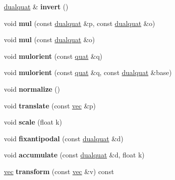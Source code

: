 \begin{DoxyCompactItemize}
\hyperlink{structdualquat}{dualquat} \& {\bfseries invert} ()
\item 
\mbox{\label{structdualquat_ac0b8fdb6d9e67813373c9957ac4b8aca}} 
void {\bfseries mul} (const \hyperlink{structdualquat}{dualquat} \&p, const \hyperlink{structdualquat}{dualquat} \&o)
\item 
\mbox{\label{structdualquat_af9940944e4a530e7f82e4f0eb5a70c74}} 
void {\bfseries mul} (const \hyperlink{structdualquat}{dualquat} \&o)
\item 
\mbox{\label{structdualquat_a39d015b5df10c297e1b56d2d966c2efe}} 
void {\bfseries mulorient} (const \hyperlink{structquat}{quat} \&q)
\item 
\mbox{\label{structdualquat_a765e740cb7fc2dfec283613cfa430413}} 
void {\bfseries mulorient} (const \hyperlink{structquat}{quat} \&q, const \hyperlink{structdualquat}{dualquat} \&base)
\item 
\mbox{\label{structdualquat_a93c67d4d04bdd2652e5c72f2d4bd3572}} 
void {\bfseries normalize} ()
\item 
\mbox{\label{structdualquat_a96d2ab7c1b91512bb3b514579497f297}} 
void {\bfseries translate} (const \hyperlink{structvec}{vec} \&p)
\item 
\mbox{\label{structdualquat_aedd716e397ffb0174e71ff7bba510c6b}} 
void {\bfseries scale} (float k)
\item 
\mbox{\label{structdualquat_a25fe6cf8ae3f08ed26f189af8a8b5de7}} 
void {\bfseries fixantipodal} (const \hyperlink{structdualquat}{dualquat} \&d)
\item 
\mbox{\label{structdualquat_a0e65a3c564046cd1321f2d94af6e8b16}} 
void {\bfseries accumulate} (const \hyperlink{structdualquat}{dualquat} \&d, float k)
\item 
\mbox{\label{structdualquat_a982a0ba7691e52c281dde62349434819}} 
\hyperlink{structvec}{vec} {\bfseries transform} (const \hyperlink{structvec}{vec} \&v) const
\item 

\end{DoxyCompactItemize}
